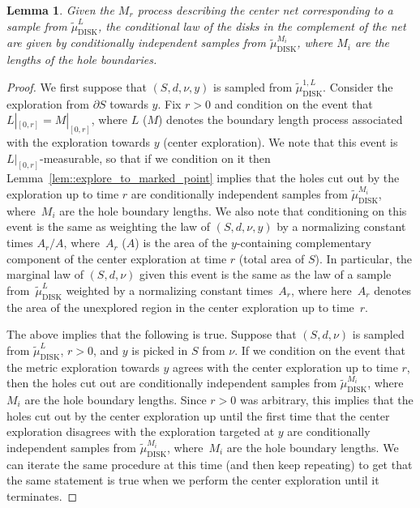 \documentclass[10pt]{amsart}
\theoremstyle{plain}
\numberwithin{theorem}{section}
\newtheorem{lemma}[theorem]{Lemma}
\theoremstyle{definition}
\newcommand{\tmudonel}{\wt{\mu}_{ \mathrm{DISK}}^{1, L}}
\newcommand{\tmudl}{\wt{\mu}_{\mathrm{DISK}}^L}
\def\tmudlset#1{\wt{\mu}_{\mathrm{DISK}}^{#1}}
\let\wt\widetilde
\begin{document}
\begin{lemma}
\label{lem::exploretocenter}
Given the $M_r$ process describing the center net corresponding to a sample from $\tmudl$, the conditional law of the disks in the complement of the net are given by conditionally independent samples from $\tmudlset{M_i}$, where $M_i$ are the lengths of the hole boundaries.
\end{lemma}
\begin{proof}
We first suppose that $(S,d,\nu,y)$ is sampled from $\tmudonel$. Consider the exploration from $\partial S$ towards $y$. Fix $r > 0$ and condition on the event that $L|_{[0,r]} = M|_{[0,r]}$, where $L$ (\resp $M$) denotes the boundary length process associated with the exploration towards $y$ (\resp center exploration). We note that this event is $L|_{[0,r]}$-measurable, so that if we condition on it then Lemma~\ref{lem::explore_to_marked_point} implies that the holes cut out by the exploration up to time $r$ are conditionally independent samples from $\tmudlset{M_i}$, where~$M_i$ are the hole boundary lengths. We also note that conditioning on this event is the same as weighting the law of $(S,d,\nu,y)$ by a normalizing constant times $A_r/A$, where~$A_r$ (\resp $A$) is the area of the $y$-containing complementary component of the center exploration at time $r$ (\resp total area of $S$). In particular, the marginal law of $(S,d,\nu)$ given this event is the same as the law of a sample from~$\tmudl$ weighted by a normalizing constant times~$A_r$, where here~$A_r$ denotes the area of the unexplored region in the center exploration up to time~$r$.

The above implies that the following is true. Suppose that $(S,d,\nu)$ is sampled from $\tmudl$, $r > 0$, and $y$ is picked in $S$ from $\nu$. If we condition on the event that the metric exploration towards $y$ agrees with the center exploration up to time $r$, then the holes cut out are conditionally independent samples from $\tmudlset{M_i}$, where $M_i$ are the hole boundary lengths. Since $r > 0$ was arbitrary, this implies that the holes cut out by the center exploration up until the first time that the center exploration disagrees with the exploration targeted at $y$ are conditionally independent samples from $\tmudlset{M_i}$, where~$M_i$ are the hole boundary lengths. We can iterate the same procedure at this time (and then keep repeating) to get that the same statement is true when we perform the center exploration until it terminates.
\end{proof}
\end{document}
